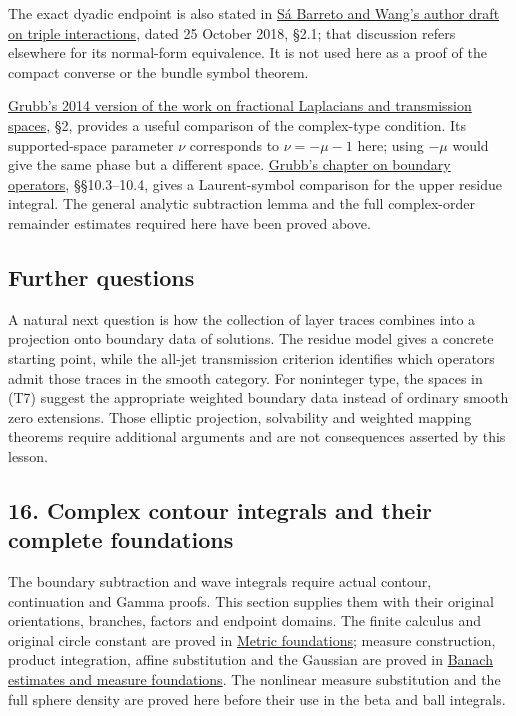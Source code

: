 \documentclass[
  11pt,
]{article}
\makeatletter
\let\ReaderOriginalAnchorStart\hyper@anchorstart
\let\ReaderOriginalAnchorEnd\hyper@anchorend
\let\ReaderPendingAliases\@empty
\def\ReaderArmAliases#1{\gdef\ReaderPendingAliases{#1}}
\def\hyper@anchorstart#1{\ReaderIfNativeAnchorTF{#1}{\ReaderPendingAliases\global\let\ReaderPendingAliases\@empty}{}\ReaderOriginalAnchorStart{#1}}
\makeatother
\begin{document}
The exact dyadic endpoint is also stated in
\href{https://www.math.purdue.edu/~sabarre/Papers/TripleInt.pdf}{Sá
Barreto and Wang's author draft on triple interactions}, dated 25
October 2018, §2.1; that discussion refers elsewhere for its normal-form
equivalence. It is not used here as a proof of the compact converse or
the bundle symbol theorem.

\href{https://arxiv.org/pdf/1310.0951v5}{Grubb's 2014 version of the
work on fractional Laplacians and transmission spaces}, §2, provides a
useful comparison of the complex-type condition. Its supported-space
parameter \(\nu\) corresponds to \(\nu=-\mu-1\) here; using \(-\mu\)
would give the same phase but a different space.
\href{https://web.math.ku.dk/~grubb/dist10.pdf}{Grubb's chapter on
boundary operators}, §§10.3--10.4, gives a Laurent-symbol comparison for
the upper residue integral. The general analytic subtraction lemma and
the full complex-order remainder estimates required here have been
proved above.

\subsection{Further questions}\label{further-questions}

A natural next question is how the collection of layer traces combines
into a projection onto boundary data of solutions. The residue model
gives a concrete starting point, while the all-jet transmission
criterion identifies which operators admit those traces in the smooth
category. For noninteger type, the spaces in (T7) suggest the
appropriate weighted boundary data instead of ordinary smooth zero
extensions. Those elliptic projection, solvability and weighted mapping
theorems require additional arguments and are not consequences asserted
by this lesson.

\ReaderArmAliases{\ReaderOriginalAnchorStart{AN03-CN-COMPLEX-000}\ReaderOriginalAnchorEnd\begingroup\expandafter\def\csname @currentHref\endcsname{AN03-CN-COMPLEX-000}\label{AN03-CN-COMPLEX-000}\endgroup\ReaderOriginalAnchorStart{complex-contour-integrals-and-their-complete-foundations}\ReaderOriginalAnchorEnd}
\subsection{16. Complex contour integrals and their complete
foundations}\label{complex-contour-integrals-and-their-complete-foundations}

The boundary subtraction and wave integrals require actual contour,
continuation and Gamma proofs. This section supplies them with their
original orientations, branches, factors and endpoint domains. The
finite calculus and original circle constant are proved in
\href{metric-foundation-bridges.pdf}{Metric foundations}; measure
construction, product integration, affine substitution and the Gaussian
are proved in \href{banach-foundation-bridges.pdf}{Banach estimates and
measure foundations}. The nonlinear measure substitution and the full
sphere density are proved here before their use in the beta and ball
integrals.
\end{document}
